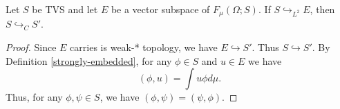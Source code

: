 \documentclass[main.tex]{subfiles}
\begin{document}
%

\begin{theorem}
Let $S$ be TVS and let $E$ be a vector subspace of $F_\mu(\Omega; S)$. If $S\hookrightarrow_{L^2} E$, then $S\hookrightarrow_C S'$.
\end{theorem}
\begin{proof}
Since $E$ carries is weak-* topology, we have $E\hookrightarrow S'$. Thus $S\hookrightarrow S'$. 
By Definition \ref{strongly-embedded},
for any $\phi\in S$ and $u\in E$ we have 
\begin{equation}
(\phi, u) = \int u\phi d\mu.
\end{equation}
Thus, for any $\phi, \psi\in S$, we have $(\phi, \psi)=(\psi, \phi)$. 
\end{proof}
\end{document}
